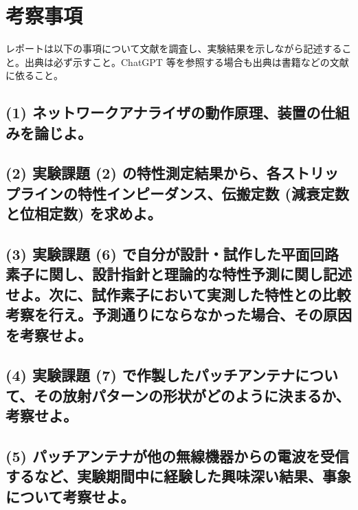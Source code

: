 \documentclass[a4paper, twocolumn]{article} %
\begin{document}
\maketitle

\section*{考察事項}
レポートは以下の事項について文献を調査し、実験結果を示しながら記述すること。出典は必ず示すこと。ChatGPT 等を参照する場合も出典は書籍などの文献に依ること。

\subsection*{(1) ネットワークアナライザの動作原理、装置の仕組みを論じよ。}

\subsection*{(2) 実験課題 (2) の特性測定結果から、各ストリップラインの特性インピーダンス、伝搬定数 (減衰定数と位相定数) を求めよ。}

\subsection*{(3) 実験課題 (6) で自分が設計・試作した平面回路素子に関し、設計指針と理論的な特性予測に関し記述せよ。次に、試作素子において実測した特性との比較考察を行え。予測通りにならなかった場合、その原因を考察せよ。}

\subsection*{(4) 実験課題 (7) で作製したパッチアンテナについて、その放射パターンの形状がどのように決まるか、考察せよ。}

\subsection*{(5) パッチアンテナが他の無線機器からの電波を受信するなど、実験期間中に経験した興味深い結果、事象について考察せよ。}
\end{document}
